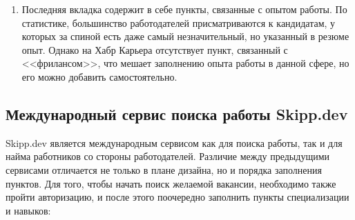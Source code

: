 \documentclass[master, och, diploma]{SCWorks}
\begin{document}
\begin{enumerate}
    \item Последняя вкладка содержит в себе пункты, связанные с опытом работы. По статистике, большинство работодателей присматриваются к кандидатам, у которых за спиной есть даже самый незначительный, но указанный в резюме опыт. Однако на Хабр Карьера отсутствует пункт, связанный с <<фрилансом>>, что мешает заполнению опыта работы в данной сфере, но его можно добавить самостоятельно.
\end{enumerate}

\subsection{Международный сервис поиска работы Skipp.dev}
Skipp.dev является международным сервисом как для поиска работы, так и для найма работников со стороны работодателей. Различие между предыдущими сервисами отличается не только в плане дизайна, но и порядка заполнения пунктов. Для того, чтобы начать поиск желаемой вакансии, необходимо также пройти авторизацию, и после этого поочередно заполнить пункты специализации и навыков:
\end{document}
